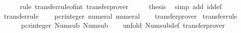\begin{isabellebody}
\ \ \ \ \isamarkupfalse%
\ {\isacharparenleft}{\kern0pt}rule\ transfer{\isacharunderscore}{\kern0pt}rule{\isacharunderscore}{\kern0pt}of{\isacharunderscore}{\kern0pt}int{\isacharparenright}{\kern0pt}\ transfer{\isacharunderscore}{\kern0pt}prover{\isacharplus}{\kern0pt}\isanewline
\ \ \isamarkupfalse%
\ \isamarkupfalse%
\ {\isacharquery}{\kern0pt}thesis\ \isamarkupfalse%
\ {\isacharparenleft}{\kern0pt}simp\ add{\isacharcolon}{\kern0pt}\ id{\isacharunderscore}{\kern0pt}def{\isacharparenright}{\kern0pt}\isanewline
{}\isamarkupfalse%
%
\endisatagproof
{\isafoldproof}%
%
\isadelimproof
\isanewline
%
\endisadelimproof
\isanewline
{}\isamarkupfalse%
\ {\isacharbrackleft}{\kern0pt}transfer{\isacharunderscore}{\kern0pt}rule{\isacharbrackright}{\kern0pt}{\isacharcolon}{\kern0pt}\isanewline
\ \ {\isachardoublequoteopen}{\isacharparenleft}{\kern0pt}{\isacharparenleft}{\kern0pt}{\isacharequal}{\kern0pt}{\isacharparenright}{\kern0pt}\ {\isacharequal}{\kern0pt}{\isacharequal}{\kern0pt}{\isacharequal}{\kern0pt}{\isachargreater}{\kern0pt}\ pcr{\isacharunderscore}{\kern0pt}integer{\isacharparenright}{\kern0pt}\ numeral\ numeral{\isachardoublequoteclose}\isanewline
%
\isadelimproof
\ \ %
\endisadelimproof
%
\isatagproof
{}\isamarkupfalse%
\ transfer{\isacharunderscore}{\kern0pt}prover%
\endisatagproof
{\isafoldproof}%
%
\isadelimproof
\isanewline
%
\endisadelimproof
\isanewline
{}\isamarkupfalse%
\ {\isacharbrackleft}{\kern0pt}transfer{\isacharunderscore}{\kern0pt}rule{\isacharbrackright}{\kern0pt}{\isacharcolon}{\kern0pt}\isanewline
\ \ {\isachardoublequoteopen}{\isacharparenleft}{\kern0pt}{\isacharparenleft}{\kern0pt}{\isacharequal}{\kern0pt}{\isacharparenright}{\kern0pt}\ {\isacharequal}{\kern0pt}{\isacharequal}{\kern0pt}{\isacharequal}{\kern0pt}{\isachargreater}{\kern0pt}\ {\isacharparenleft}{\kern0pt}{\isacharequal}{\kern0pt}{\isacharparenright}{\kern0pt}\ {\isacharequal}{\kern0pt}{\isacharequal}{\kern0pt}{\isacharequal}{\kern0pt}{\isachargreater}{\kern0pt}\ pcr{\isacharunderscore}{\kern0pt}integer{\isacharparenright}{\kern0pt}\ Num{\isachardot}{\kern0pt}sub\ Num{\isachardot}{\kern0pt}sub{\isachardoublequoteclose}\isanewline
%
\isadelimproof
\ \ %
\endisadelimproof
%
\isatagproof
{}\isamarkupfalse%
\ {\isacharparenleft}{\kern0pt}unfold\ Num{\isachardot}{\kern0pt}sub{\isacharunderscore}{\kern0pt}def{\isacharparenright}{\kern0pt}\ transfer{\isacharunderscore}{\kern0pt}prover%
\endisatagproof
{\isafoldproof}%
%
\isadelimproof
\isanewline

\end{isabellebody}
